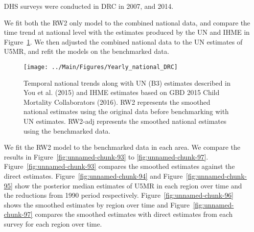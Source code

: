 \documentclass[12pt]{article}\usepackage[]{graphicx}\usepackage[]{color}
\newenvironment{knitrout}{}{} %
\begin{document}


DHS surveys were conducted in DRC in 2007, and 2014.

We fit both the RW2 only model to the combined national data, and compare the time trend at national level with the estimates produced by the UN and IHME in Figure~\ref{fig:unnamed-chunk-92}. We then adjusted the combined national data to the UN estimates of U5MR, and refit the models on the benchmarked data. 

\begin{knitrout}
\color{fgcolor}\begin{figure}[bht]

{\centering \texttt{[image: ../Main/Figures/Yearly\_national\_DRC]} 

}

\caption[Temporal national trends along with UN (B3) estimates described in You et al]{Temporal national trends along with UN (B3) estimates described in You et al. (2015) and IHME estimates based on GBD 2015 Child Mortality Collaborators (2016). RW2 represents the smoothed national estimates using the original data before benchmarking with UN estimates. RW2-adj represents the smoothed national estimates using the benchmarked data.}\label{fig:unnamed-chunk-92}
\end{figure}


\end{knitrout}
 

We fit the RW2 model to the benchmarked data in each area. 
We compare the results in Figure~\ref{fig:unnamed-chunk-93} to \ref{fig:unnamed-chunk-97}.
Figure~\ref{fig:unnamed-chunk-93} compares the smoothed estimates against the direct estimates. Figure~\ref{fig:unnamed-chunk-94} and Figure~\ref{fig:unnamed-chunk-95} show the posterior median estimates of U5MR in each region over time and the reductions from 1990 period respectively.
Figure~\ref{fig:unnamed-chunk-96} shows the smoothed estimates by region over time and Figure~\ref{fig:unnamed-chunk-97} compares the smoothed estimates with direct estimates from each survey for each region over time.


\end{document}
